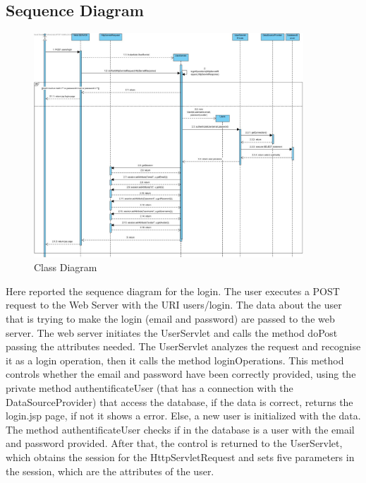 \subsection{Sequence Diagram}

\begin{figure}[h!]
\centering
\includegraphics[width=0.9\textwidth]{sections/BLL/Sequence Diagram.jpg}
\caption{Class Diagram}
\end{figure}


Here reported the sequence diagram for the login. The user executes a POST request to the Web Server with the URI users/login. The data about the user that is trying to make the login (email and password) are passed to the web server. The web server initiates the UserServlet and calls the method doPost passing the attributes needed. The UserServlet analyzes the request and recognise it as a login operation, then it calls the method loginOperations. This method controls whether the email and password have been correctly provided, using the private method authentificateUser (that has a connection with the DataSourceProvider) that access the database, if the data is correct, returns the login.jsp page, if not it shows a error. Else, a new user is initialized with the data. The method authentificateUser checks if in the database is a user with the email and password provided. After that, the control is returned to the UserServlet, which obtains the session for the HttpServletRequest and sets five parameters in the session, which are the attributes of the user.
